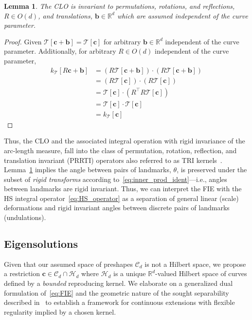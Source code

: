 \documentclass[pdflatex,iicol]{sn-jnl}%
\theoremstyle{thmstyleone}%
\newtheorem{lemma}{Lemma}%
\theoremstyle{thmstyletwo}%
\theoremstyle{thmstylethree}%
\begin{document}
\begin{lemma}\label{lemma:CLO_invariance}
    The CLO is invariant to permutations, rotations, and reflections, $R \in O(d)$, and translations, $\boldsymbol{b} \in \mathbb{R}^d$ which are assumed independent of the curve parameter.
\end{lemma}
\begin{proof}
    Given $\mathcal{T}[\boldsymbol{c} +\boldsymbol{b}] = \mathcal{T}[\boldsymbol{c}]$ for arbitrary $\boldsymbol{b} \in \mathbb{R}^d$ independent of the curve parameter. Additionally, for arbitrary $R \in O(d)$ independent of the curve parameter,
    \begin{align}
        k_{\mathcal{T}}[R\boldsymbol{c} + \boldsymbol{b}] &= \left(R\mathcal{T}[\boldsymbol{c} + \boldsymbol{b}]\right) \cdot \left( R \mathcal{T}[\boldsymbol{c} + \boldsymbol{b}]\right)\\ \nonumber
        &= \left(R\mathcal{T}[\boldsymbol{c}]\right) \cdot \left( R \mathcal{T}[\boldsymbol{c}]\right)\\ \nonumber
        &= \mathcal{T}[\boldsymbol{c}] \cdot \left( R^{\top}R \mathcal{T}[\boldsymbol{c}]\right)\\ \nonumber
        &= \mathcal{T}[\boldsymbol{c}]\cdot \mathcal{T}[\boldsymbol{c}]\\ \nonumber
        &= k_{\mathcal{T}}[\boldsymbol{c}] \nonumber
    \end{align}
\end{proof}
Thus, the CLO and the associated integral operation with rigid invariance of the arc-length measure, fall into the class of permutation, rotation, reflection, and translation invariant (PRRTI) operators also referred to as TRI kernels~\cite{micheli2013matrix}. Lemma~\ref{lemma:CLO_invariance} implies the angle between pairs of landmarks, $\theta$, is preserved under the subset of \emph{rigid transforms} according to~\eqref{eq:inner_prod_ident}---i.e., angles between landmarks are rigid invariant. Thus, we can interpret the FIE with the HS integral operator~\eqref{eq:HS_operator} as a separation of general linear (scale) deformations and rigid invariant angles between discrete pairs of landmarks (undulations). 

\subsection{Eigensolutions}\label{sec:e_solns}
Given that our assumed space of preshapes $\mathcal{C}_d$ is not a Hilbert space, we propose a restriction $\boldsymbol{c} \in \mathcal{C}_d \cap \mathcal{H}_d$ where $\mathcal{H}_d$ is a unique $\mathbb{R}^d$-valued Hilbert space of curves defined by a \textit{bounded} reproducing kernel. We elaborate on a generalized dual formulation of~\eqref{eq:FIE} and the geometric nature of the sought separability described in~\cite{grey2023separable} to establish a framework for continuous extensions with flexible regularity implied by a chosen kernel. 
\end{document}
